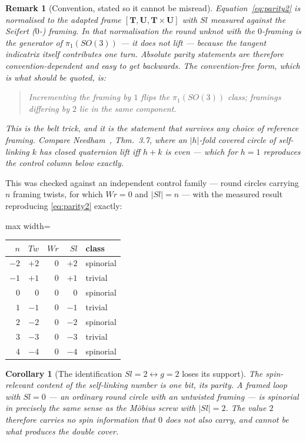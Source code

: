 \documentclass[11pt,a4paper]{article}
\newtheorem{corollary}{Corollary}
\newtheorem{remark}{Remark}
\begin{document}
\begin{remark}[Convention, stated so it cannot be misread]
\label{rem:convention}
Equation~\eqref{eq:parity2} is normalised to the adapted frame
$[\bm{T},\bm{U},\bm{T}\times\bm{U}]$ with $Sl$ measured against the
Seifert ($0$-) framing.  In that normalisation the round unknot with the
$0$-framing is the \emph{generator} of $\pi_1(SO(3))$ --- it does not
lift --- because the tangent indicatrix itself contributes one turn.
Absolute parity statements are therefore convention-dependent and easy to
get backwards.  The convention-free form, which is what should be quoted,
is:
\begin{quote}
\emph{Incrementing the framing by $1$ flips the $\pi_1(SO(3))$ class;
framings differing by $2$ lie in the same component.}
\end{quote}
This is the belt trick, and it is the statement that survives any choice
of reference framing.  Compare Needham~\cite{needham2017}, Thm.~3.7,
where an $|h|$-fold covered circle of self-linking $k$ has closed
quaternion lift iff $h+k$ is even --- which for $h=1$ reproduces the
control column below exactly.
\end{remark}

This was checked against an independent control family --- round circles
carrying $n$ framing twists, for which $Wr = 0$ and $|Sl| = n$ --- with
the measured result reproducing \eqref{eq:parity2} exactly:

\begin{center}
\begin{adjustbox}{max width=\linewidth}\begin{tabular}{@{}rrrrl@{}}
\toprule
$n$ & $Tw$ & $Wr$ & $Sl$ & class \\
\midrule
$-2$ & $+2$ & $0$ & $+2$ & spinorial \\
$-1$ & $+1$ & $0$ & $+1$ & trivial \\
$0$  & $0$  & $0$ & $0$  & spinorial \\
$1$  & $-1$ & $0$ & $-1$ & trivial \\
$2$  & $-2$ & $0$ & $-2$ & spinorial \\
$3$  & $-3$ & $0$ & $-3$ & trivial \\
$4$  & $-4$ & $0$ & $-4$ & spinorial \\
\bottomrule
\end{tabular}\end{adjustbox}
\end{center}

\begin{corollary}[The identification $Sl=2 \leftrightarrow g=2$ loses its support]
\label{cor:kill}
The spin-relevant content of the self-linking number is one bit, its
parity.  A framed loop with $Sl = 0$ --- an ordinary round circle with an
untwisted framing --- is spinorial in precisely the same sense as the
M\"obius screw with $|Sl| = 2$.  The \emph{value} $2$ therefore carries no
spin information that $0$ does not also carry, and cannot be what
produces the double cover.
\end{corollary}
\end{document}
